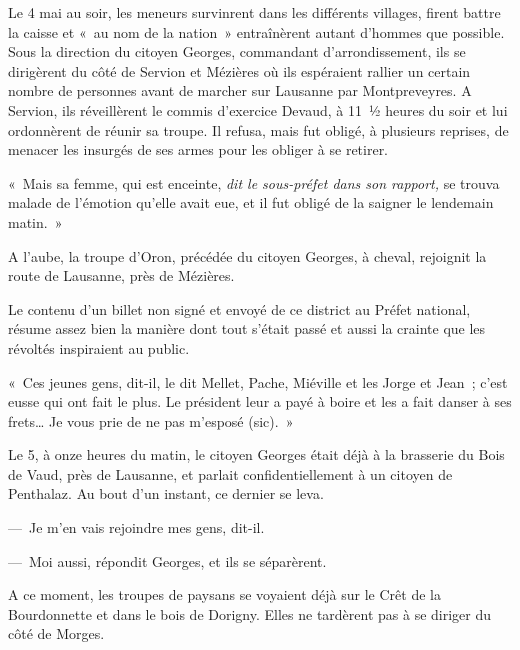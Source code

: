 \documentclass[french,twoside]{book} %
\newcommand\sic[1]{#1}
\newenvironment{quoteblock}%
  {\begin{quoting}}
  {\end{quoting}}
\newenvironment{quotebar}{%
    \def\FrameCommand{{\color{rubric!10!}\vrule width 0.5em} \hspace{0.9em}}%
    \def\OuterFrameSep{\itemsep} %
    \MakeFramed {\advance\hsize-\width \FrameRestore}
  }%
  {%
    \endMakeFramed
  }
\renewenvironment{quoteblock}%
  {%
    \savenotes
    \setstretch{0.9}
    \normalfont
    \begin{quotebar}
  }
  {%
    \end{quotebar}
    \spewnotes
  }
\begin{document}
Le 4 mai au soir, les meneurs survinrent dans les différents villages, firent battre la caisse et « au nom de la nation » entraînèrent autant d’hommes que possible. Sous la direction du citoyen Georges, commandant d’arrondissement, ils se dirigèrent du côté de Servion et Mézières où ils espéraient rallier un certain nombre de personnes avant de marcher sur Lausanne par Montpreveyres. A Servion, ils réveillèrent le commis d’exercice Devaud, à 11 ½ heures du soir et lui ordonnèrent de réunir sa troupe. Il refusa, mais fut obligé, à plusieurs reprises, de menacer les insurgés de ses armes pour les obliger à se retirer.\par

\begin{quoteblock}
\noindent « Mais sa femme, qui est enceinte, \emph{dit le sous-préfet dans son rapport, }se trouva malade de l’émotion qu’elle avait eue, et il fut obligé de la saigner le lendemain matin. »\end{quoteblock}

\noindent A l’aube, la troupe d’Oron, précédée du citoyen Georges, à cheval, rejoignit la route de Lausanne, près de Mézières.\par
Le contenu d’un billet non signé et envoyé de ce district au Préfet national, résume assez bien la manière dont tout s’était passé et aussi la crainte que les révoltés inspiraient au public.\par

\begin{quoteblock}
\noindent « Ces jeunes gens, dit-il, le dit Mellet, Pache, Miéville et les Jorge et Jean ; c’est eusse qui ont fait le plus. Le président leur a payé à boire et les a fait danser à ses frets… Je vous prie de ne pas m’esposé {{\sic (sic)}}. »\end{quoteblock}

\noindent Le 5, à onze heures du matin, le citoyen Georges était déjà à la brasserie du Bois de Vaud, près de Lausanne, et parlait confidentiellement à un citoyen de Penthalaz. Au bout d’un instant, ce dernier se leva.\par
— Je m’en vais rejoindre mes gens, dit-il.\par
— Moi aussi, répondit Georges, et ils se séparèrent.\par
A ce moment, les troupes de paysans se voyaient déjà sur le Crêt de la Bourdonnette et dans le bois de Dorigny. Elles ne tardèrent pas à se diriger du côté de Morges.
\end{document}
